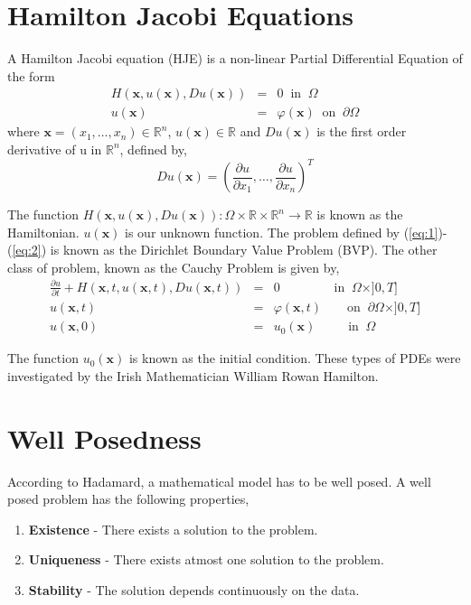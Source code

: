 
\section{Hamilton Jacobi Equations}
A Hamilton Jacobi equation (HJE) is a non-linear Partial Differential Equation of the form
\begin{eqnarray}
  H(\mathbf{x},u(\mathbf{x}),Du(\mathbf{x})) &=& 0 \;\; \text{in} \;\; \Omega \label{eq:1}\\
  u(\mathbf{x}) &=& \varphi(\mathbf{x}) \;\; \text{on} \;\; \partial \Omega \label{eq:2}
\end{eqnarray}
where $\mathbf{x} = (x_1,\dots,x_n) \in \mathbb{R}^n$, $u(\mathbf{x}) \in \mathbb{R}$ and $Du(\mathbf{x})$ is the first order derivative of u in $\mathbb{R}^n$, defined by,
\begin{equation}
  Du(\mathbf{x}) = \left(\frac{\partial u}{\partial x_1},\dots ,\frac{\partial u}{\partial x_n}\right)^T
\end{equation}

\noindent
The function $H(\mathbf{x},u(\mathbf{x}),Du(\mathbf{x})) : \Omega \times \mathbb{R} \times \mathbb{R}^n \to \mathbb{R}$ is known as the Hamiltonian. $u(\mathbf{x})$ is our unknown function. The problem defined by (\ref{eq:1})-(\ref{eq:2}) is known as the Dirichlet Boundary Value Problem (BVP). The other class of problem, known as the Cauchy Problem is given by,
\begin{eqnarray}
  \frac{\partial u }{\partial t} + H(\mathbf{x},t,u(\mathbf{x},t),Du(\mathbf{x},t)) &=& 0 \qquad \qquad \; \text{in} \;\; \Omega \times ]0,T] \label{eq:3}\\
  u(\mathbf{x},t) &=& \varphi(\mathbf{x},t) \qquad \text{on} \;\; \partial \Omega \times ]0,T]\label{eq:4}\\
  u(\mathbf{x},0) &=& u_0(\mathbf{x}) \qquad \;\; \text{in} \;\; \Omega
\end{eqnarray}

\noindent
The function $u_0(\mathbf{x})$ is known as the initial condition. These types of PDEs were investigated by the Irish Mathematician William Rowan Hamilton\cite{ham1,ham2}.

\section{Well Posedness}
According to Hadamard\cite{hadamard}, a mathematical model has to be well posed. A well posed problem has the following properties,
\begin{enumerate}
\item
\textbf{Existence} - There exists a solution to the problem.
\item
\textbf{Uniqueness} - There exists atmost one solution to the problem.
\item
\textbf{Stability} - The solution depends continuously on the data.
\end{enumerate}

